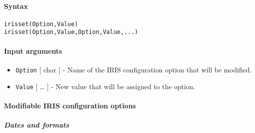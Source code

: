 


	\paragraph{Syntax}\label{syntax}

\begin{verbatim}
irisset(Option,Value)
irisset(Option,Value,Option,Value,...)
\end{verbatim}

\paragraph{Input arguments}\label{input-arguments}

\begin{itemize}
\item
  \texttt{Option} {[} char {]} - Name of the IRIS configuration option
  that will be modified.
\item
  \texttt{Value} {[} \ldots{} {]} - New value that will be assigned to
  the option.
\end{itemize}

\paragraph{Modifiable IRIS configuration
options}\label{modifiable-iris-configuration-options}

\subparagraph{Dates and formats}\label{dates-and-formats}

